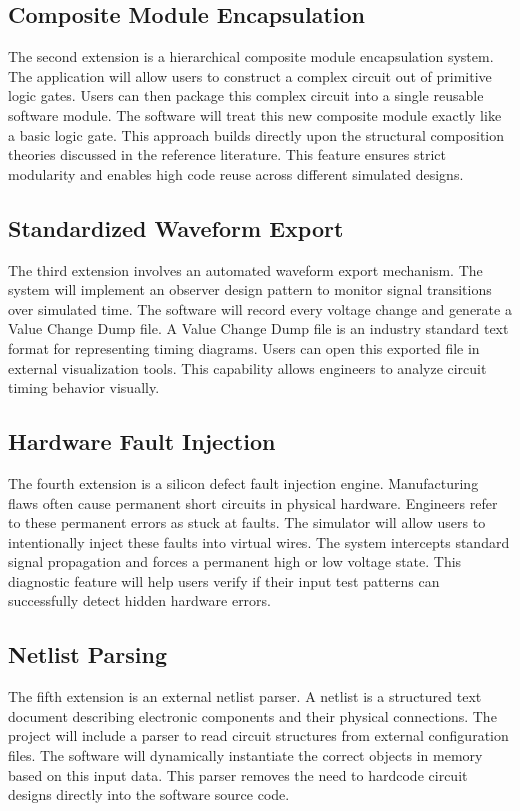 \documentclass[12pt, a4paper]{article}
\begin{document}
\subsection{Composite Module Encapsulation}
The second extension is a hierarchical composite module encapsulation system. The application will allow users to construct a complex circuit out of primitive logic gates. Users can then package this complex circuit into a single reusable software module. The software will treat this new composite module exactly like a basic logic gate. This approach builds directly upon the structural composition theories discussed in the reference literature. This feature ensures strict modularity and enables high code reuse across different simulated designs.

\subsection{Standardized Waveform Export}
The third extension involves an automated waveform export mechanism. The system will implement an observer design pattern to monitor signal transitions over simulated time. The software will record every voltage change and generate a Value Change Dump file. A Value Change Dump file is an industry standard text format for representing timing diagrams. Users can open this exported file in external visualization tools. This capability allows engineers to analyze circuit timing behavior visually.

\subsection{Hardware Fault Injection}
The fourth extension is a silicon defect fault injection engine. Manufacturing flaws often cause permanent short circuits in physical hardware. Engineers refer to these permanent errors as stuck at faults. The simulator will allow users to intentionally inject these faults into virtual wires. The system intercepts standard signal propagation and forces a permanent high or low voltage state. This diagnostic feature will help users verify if their input test patterns can successfully detect hidden hardware errors.

\subsection{Netlist Parsing}
The fifth extension is an external netlist parser. A netlist is a structured text document describing electronic components and their physical connections. The project will include a parser to read circuit structures from external configuration files. The software will dynamically instantiate the correct objects in memory based on this input data. This parser removes the need to hardcode circuit designs directly into the software source code.
\end{document}

